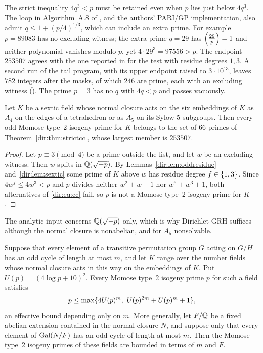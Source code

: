 \begin{remark}\label{dir:rem:strict}
The strict inequality $4q^3<p$ must be retained even when $p$ lies just below $4q^3$.
The loop in Algorithm~A.8 of \cite{BanwaitDerickx2023Towards}, and the authors'
PARI/GP implementation, also admit $q\le1+(p/4)^{1/3}$, which can include an extra
prime. For example $p=89083$ has no excluding witness; the extra prime $q=29$ has
$\Bigl(\frac{29}{p}\Bigr)=1$ and neither polynomial vanishes modulo $p$, yet
$4\cdot29^3=97556>p$. The endpoint $253507$ agrees with the one reported in
\cite[Appendix~A, Example~A.13]{BanwaitDerickx2023Towards} for the test with residue
degrees $1,3$. A second run of the tail program, with its upper endpoint raised to
$3\cdot10^{13}$, leaves $782$ integers after the masks, of which $246$ are prime, each
with an excluding witness ().
The prime $p=3$ has no $q$ with $4q<p$ and passes vacuously.
\end{remark}

\begin{theorem}\label{dir:thm:sexticisogeny}
Let $K$ be a sextic field whose normal closure acts on the six embeddings of $K$ as
$A_4$ on the edges of a tetrahedron or as $A_5$ on its Sylow $5$-subgroups. Then every
odd Momose type~2 isogeny prime for $K$ belongs to the set of $66$ primes of
Theorem~\ref{dir:thm:strictcc}, whose largest member is $253507$.
\end{theorem}

\begin{proof}
Let $p\equiv3\pmod4$ be a prime outside the list, and let $w$ be an excluding witness.
Then $w$ splits in $\mathbb{Q}(\sqrt{-p})$. By Lemmas~\ref{dir:lem:oddresidue} and~\ref{dir:lem:sextic} some
prime of $K$ above $w$ has residue degree $f\in\{1,3\}$. Since $4w^f\le4w^3<p$ and
$p$ divides neither $w^2+w+1$ nor $w^6+w^3+1$, both alternatives of \eqref{dir:eq:cc}
fail, so $p$ is not a Momose type~2 isogeny prime for $K$.
\end{proof}

The analytic input concerns $\mathbb{Q}(\sqrt{-p})$ only, which is why Dirichlet GRH suffices
although the normal closure is nonabelian, and for $A_5$ nonsolvable.

\begin{proposition}\label{dir:prop:isogenygeneral}
Suppose that every element of a transitive permutation group $G$ acting on $G/H$ has
an odd cycle of length at most $m$, and let $K$ range over the number fields whose
normal closure acts in this way on the embeddings of $K$. Put $U(p)=(4\log p+10)^2$.
Every Momose type~2 isogeny prime $p$ for such a field satisfies
\[
 p\le\max\set{4U(p)^m,\ U(p)^{2m}+U(p)^m+1},
\]
an effective bound depending only on $m$. More generally, let $F/\mathbb{Q}$ be a fixed
abelian extension contained in the normal closure $N$, and suppose only that every
element of $\operatorname{Gal}(N/F)$ has an odd cycle of length at most $m$. Then the Momose type~2
isogeny primes of these fields are bounded in terms of $m$ and $F$.
\end{proposition}


